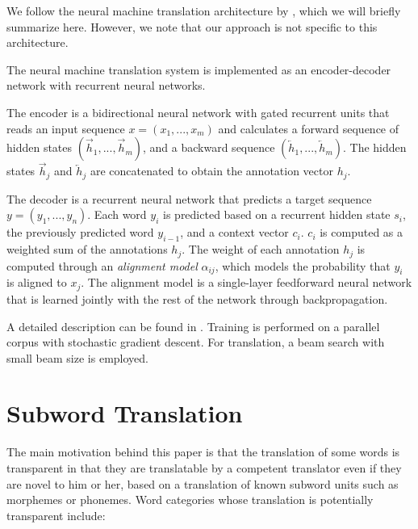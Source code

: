 We follow the neural machine translation architecture by , which we will briefly summarize here. However, we note that our approach is not specific to this architecture.

The neural machine translation system is implemented as an encoder-decoder network with recurrent neural networks.

The encoder is a bidirectional neural network with gated recurrent units \cite{cho-EtAl:2014:EMNLP2014} that reads an input sequence $x=(x_1,...,x_m)$ and calculates a forward sequence of hidden states $(\overrightarrow{h}_1,...,\overrightarrow{h}_m)$,
and a backward sequence $(\overleftarrow{h}_1,...,\overleftarrow{h}_m)$.
The hidden states $\overrightarrow{h}_j$ and $\overleftarrow{h}_j$ are concatenated to obtain the annotation vector $h_j$.

The decoder is a recurrent neural network that predicts a target sequence $y=(y_1,...,y_n)$. Each word $y_i$ is predicted based on a recurrent hidden state $s_i$, the previously predicted word $y_{i-1}$, and a context vector $c_i$. $c_i$ is computed as a weighted sum of the annotations $h_j$. The weight of each annotation $h_j$ is computed through an \emph{alignment model} $\alpha_{ij}$, which models the probability that $y_i$ is aligned to $x_j$. The alignment model is a single-layer feedforward neural network that is learned jointly with the rest of the network through backpropagation.

A detailed description can be found in \cite{DBLP:journals/corr/BahdanauCB14}. Training is performed on a parallel corpus with stochastic gradient descent. For translation, a beam search with small beam size is employed.

\section{Subword Translation}

The main motivation behind this paper is that the translation of some words is transparent in that they are translatable by a competent translator even if they are novel to him or her, based on a translation of known subword units such as morphemes or phonemes. Word categories whose translation is potentially transparent include:

